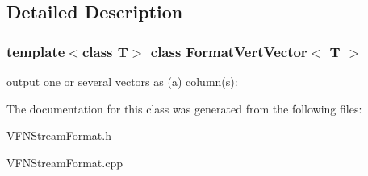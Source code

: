 \subsection{Detailed Description}
\subsubsection*{template$<$class T$>$\newline
class Format\+Vert\+Vector$<$ T $>$}

output one or several vectors as (a) column(s)\+:


\begin{DoxyCode}{0}
\DoxyCodeLine{\textcolor{comment}{// For 7 vectors with width 12 and precision 4,}}
\DoxyCodeLine{\textcolor{comment}{// pVect being a pointer to an array of 7 vectors:}}
\end{DoxyCode}
 

The documentation for this class was generated from the following files\+:\begin{DoxyCompactItemize}
\item 
V\+F\+N\+Stream\+Format.\+h\item 
V\+F\+N\+Stream\+Format.\+cpp\end{DoxyCompactItemize}
